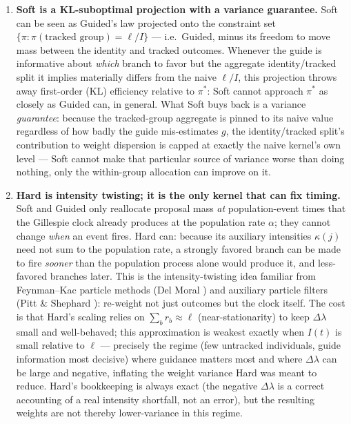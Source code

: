\documentclass[11pt]{article}
\theoremstyle{plain}
\begin{document}
\begin{enumerate}
\item[(iii)] \textbf{Soft is a KL-suboptimal projection with a variance guarantee.} Soft can be
seen as Guided's law projected onto the constraint set $\{\pi : \pi(\text{tracked group}) =
\ell/I\}$ --- i.e.\ Guided, minus its freedom to move mass between the identity and tracked
outcomes. Whenever the guide is informative about \emph{which} branch to favor but the aggregate
identity/tracked split it implies materially differs from the naive $\ell/I$, this projection
throws away first-order (KL) efficiency relative to $\pi^*$: Soft cannot approach $\pi^*$ as
closely as Guided can, in general. What Soft buys back is a variance \emph{guarantee}: because the
tracked-group aggregate is pinned to its naive value regardless of how badly the guide
mis-estimates $g$, the identity/tracked split's contribution to weight dispersion is capped at
exactly the naive kernel's own level --- Soft cannot make that particular source of variance worse
than doing nothing, only the within-group allocation can improve on it.

\item[(iv)] \textbf{Hard is intensity twisting; it is the only kernel that can fix timing.} Soft
and Guided only reallocate proposal mass \emph{at} population-event times that the Gillespie clock
already produces at the population rate $\alpha$; they cannot change \emph{when} an event fires.
Hard can: because its auxiliary intensities $\kappa(j)$ need not sum to the population rate, a
strongly favored branch can be made to fire \emph{sooner} than the population process alone would
produce it, and less-favored branches later. This is the intensity-twisting idea familiar from
Feynman--Kac particle methods (Del Moral \cite{DelMoral}) and auxiliary particle filters (Pitt \&
Shephard \cite{PittShephard}): re-weight not just outcomes but the clock itself. The cost is that
Hard's scaling relies on $\sum_b r_b\approx \ell$ (near-stationarity) to keep $\Delta\lambda$ small
and well-behaved; this approximation is weakest exactly when $I(t)$ is small relative to $\ell$
--- precisely the regime (few untracked individuals, guide information most decisive) where
guidance matters most and where $\Delta\lambda$ can be large and negative, inflating the weight
variance Hard was meant to reduce. Hard's bookkeeping is always exact (the negative $\Delta\lambda$
is a correct accounting of a real intensity shortfall, not an error), but the resulting weights are
not thereby lower-variance in this regime.


\end{enumerate}
\end{document}

